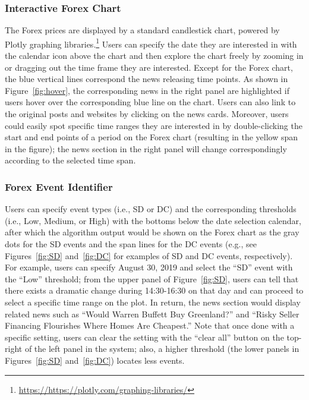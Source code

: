 \documentclass[sigconf]{acmart}
\begin{document}
\subsubsection{Interactive Forex Chart}
The Forex prices are displayed by a standard candlestick chart, powered by Plotly graphing libraries.\footnote{\url{https://https://plotly.com/graphing-libraries/}}
Users can specify the date they are interested in with the calendar icon above the chart and then explore the chart freely by zooming in or dragging out the time frame they are interested.
Except for the Forex chart, the blue vertical lines correspond the news releasing time points. 
As shown in Figure~\ref{fig:hover}, the corresponding news in the right panel are highlighted if users hover over the corresponding blue line on the chart.
Users can also link to the original posts and websites by clicking on the news cards.
Moreover, users could easily spot specific time ranges they are interested in by double-clicking the start and end points of a period on the Forex chart (resulting in the yellow span in the figure); the news section in the right panel will change correspondingly according to the selected time span.


\subsubsection{Forex Event Identifier}
Users can specify event types (i.e., SD or DC) and the corresponding thresholds (i.e., Low, Medium, or High) with the bottoms below the date selection calendar, after which the algorithm output would be shown on the Forex chart as the gray dots for the SD events and the span lines for the DC events (e.g., see Figures~\ref{fig:SD} and~\ref{fig:DC} for examples of SD and DC events, respectively).
For example, users can specify August 30, 2019 and select the ``SD'' event with the ``Low'' threshold; from the upper panel of Figure~\ref{fig:SD}, users can tell that there exists a dramatic change during 14:30-16:30 on that day and can proceed to select a specific time range on the plot. 
In return, the news section would display related news such as ``Would Warren Buffett Buy Greenland?'' and ``Risky Seller Financing Flourishes Where Homes Are Cheapest.'' 
Note that once done with a specific setting, users can clear the setting with the ``clear all'' button on the top-right of the left panel in the system; also, a higher threshold (the lower panels in Figures~\ref{fig:SD} and~\ref{fig:DC}) locates less events.
\end{document}
